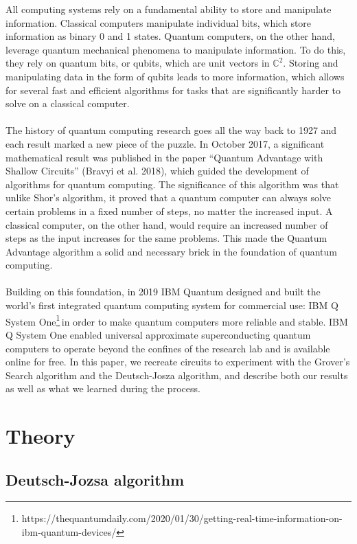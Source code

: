 \documentclass{article}
\newcommand{\ibm}{\footnote{https://thequantumdaily.com/2020/01/30/getting-real-time-information-on-ibm-quantum-devices/}}
\begin{document}
    \noindent
    All computing systems rely on a fundamental ability to store and manipulate information. Classical computers manipulate individual bits, which store information as binary 0 and 1 states. Quantum computers, on the other hand, leverage quantum mechanical phenomena to manipulate information. To do this, they rely on quantum bits, or qubits, which are unit vectors in $\mathbb{C}^2$. Storing and manipulating data in the form of qubits leads to more information, which allows for several fast and efficient algorithms for tasks that are significantly harder to solve on a classical computer.
    \\
    \smallskip
    \\
    The history of quantum computing research goes all the way back to 1927 and each result marked a new piece of the puzzle. In October 2017, a significant mathematical result was published in the paper “Quantum Advantage with Shallow Circuits” (Bravyi et al. 2018), which guided the development of algorithms for quantum computing. The significance of this algorithm was that unlike Shor’s algorithm, it proved that a quantum computer can always solve certain problems in a fixed number of steps, no matter the increased input. A classical computer, on the other hand,  would require an increased number of steps as the input increases for the same problems. This made the Quantum Advantage algorithm a solid and necessary brick in the foundation of quantum computing.
    \\
    \smallskip
    \\
    Building on this foundation, in 2019 IBM Quantum designed and built the world’s first integrated quantum computing system for commercial use: IBM Q System One\ibm\,in order to make quantum computers more reliable and stable. IBM Q System One enabled universal approximate superconducting quantum computers to operate beyond the confines of the research lab and is available online for free. In this paper, we recreate circuits to experiment with the Grover’s Search algorithm and the Deutsch-Josza algorithm, and describe both our results as well as what we learned during the process.


\section{Theory}
    \subsection{Deutsch-Jozsa algorithm}
    
\end{document}
